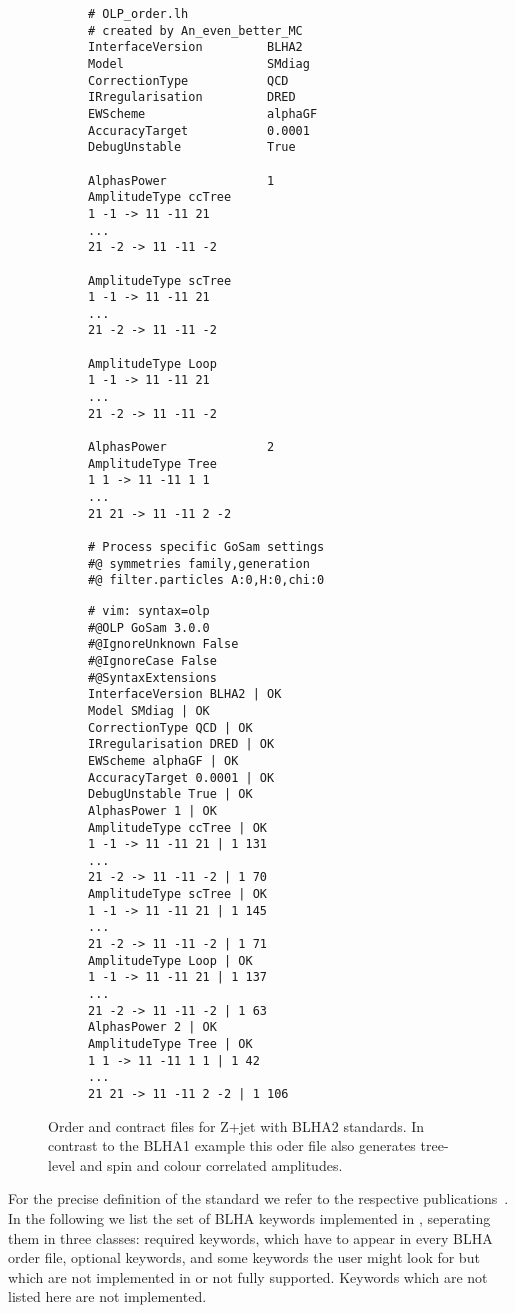 \begin{figure}
\centering
\begin{subfigure}[]{0.49\textwidth}
\centering
\begin{lstlisting}[title={BLHA2 order file},gobble=0,style=insmall,keepspaces=true,frame=single]
# OLP_order.lh
# created by An_even_better_MC
InterfaceVersion         BLHA2
Model                    SMdiag
CorrectionType           QCD
IRregularisation         DRED
EWScheme                 alphaGF
AccuracyTarget           0.0001
DebugUnstable            True

AlphasPower              1
AmplitudeType ccTree
1 -1 -> 11 -11 21
...
21 -2 -> 11 -11 -2

AmplitudeType scTree
1 -1 -> 11 -11 21
...
21 -2 -> 11 -11 -2

AmplitudeType Loop
1 -1 -> 11 -11 21
...
21 -2 -> 11 -11 -2

AlphasPower              2
AmplitudeType Tree
1 1 -> 11 -11 1 1
...
21 21 -> 11 -11 2 -2

# Process specific GoSam settings
#@ symmetries family,generation
#@ filter.particles A:0,H:0,chi:0
\end{lstlisting}
\end{subfigure}
\hspace*{5pt}
\begin{subfigure}[]{0.46\textwidth}
\centering
\begin{lstlisting}[title={BLHA2 contract file},gobble=0,style=insmall,keepspaces=true,frame=single]
# vim: syntax=olp
#@OLP GoSam 3.0.0
#@IgnoreUnknown False
#@IgnoreCase False
#@SyntaxExtensions
InterfaceVersion BLHA2 | OK
Model SMdiag | OK
CorrectionType QCD | OK
IRregularisation DRED | OK
EWScheme alphaGF | OK
AccuracyTarget 0.0001 | OK
DebugUnstable True | OK
AlphasPower 1 | OK
AmplitudeType ccTree | OK
1 -1 -> 11 -11 21 | 1 131
...
21 -2 -> 11 -11 -2 | 1 70
AmplitudeType scTree | OK
1 -1 -> 11 -11 21 | 1 145
...
21 -2 -> 11 -11 -2 | 1 71
AmplitudeType Loop | OK
1 -1 -> 11 -11 21 | 1 137
...
21 -2 -> 11 -11 -2 | 1 63
AlphasPower 2 | OK
AmplitudeType Tree | OK
1 1 -> 11 -11 1 1 | 1 42
...
21 21 -> 11 -11 2 -2 | 1 106
\end{lstlisting}
\end{subfigure}
\caption{Order and contract files for Z+jet with BLHA2 standards. In contrast to the BLHA1 example this oder file also generates tree-level and spin and colour correlated amplitudes.}
\label{fig:BLHA2}
\end{figure}  

For the precise definition of the standard we refer to the respective publications~\cite{Binoth:2010xt,Alioli:2013nda}. In the following we list the set of BLHA keywords implemented in \gosam, seperating them in three classes: required keywords, which have to appear in every BLHA order file, optional keywords, and some keywords the user might look for but which are not implemented in \gosam or not fully supported. Keywords which are not listed here are not implemented.

